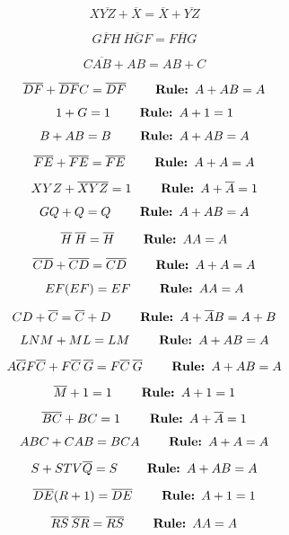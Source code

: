 $$X \overline{YZ} + \overline{X} = \overline{X} + \overline{YZ}$$

$$\overline{GFH} \> \overline{HGF} = \overline{FHG}$$

$$C\overline{AB} + AB = AB + C$$







$$\overline{DF} + \overline{DF} C = \overline{DF} \hskip 20pt \hbox{ \bf Rule: } A + AB = A$$

$$1 + G = 1 \hskip 20pt \hbox{ \bf Rule: } A + 1 = 1$$

$$B + AB = B \hskip 20pt \hbox{ \bf Rule: } A + AB = A$$

$$\overline{FE} + \overline{FE} = \overline{FE} \hskip 20pt \hbox{ \bf Rule: } A + A = A$$

$$XYZ + \overline{XYZ} = 1 \hskip 20pt \hbox{ \bf Rule: } A + \overline{A} = 1$$

$$GQ + Q = Q \hskip 20pt \hbox{ \bf Rule: } A + AB = A$$

$$\overline{H} \> \overline{H} = \overline{H} \hskip 20pt \hbox{ \bf Rule: } AA = A$$

$$\overline{CD} + \overline{CD} = \overline{CD} \hskip 20pt \hbox{ \bf Rule: } A + A = A$$

$$EF(EF) = EF \hskip 20pt \hbox{ \bf Rule: } AA = A$$

$$CD + \overline{C} = \overline{C} + D \hskip 20pt \hbox{ \bf Rule: } A + \overline{A}B = A + B$$

$$LNM + ML = LM \hskip 20pt \hbox{ \bf Rule: } A + AB = A$$

$$A \overline{G} F \overline{C} + F \overline{C} \> \overline{G} = F \overline{C} \> \overline{G} \hskip 20pt \hbox{ \bf Rule: } A + AB = A$$

$$\overline{M} + 1 = 1 \hskip 20pt \hbox{ \bf Rule: } A + 1 = 1$$

$$\overline{BC} + BC = 1 \hskip 20pt \hbox{ \bf Rule: } A + \overline{A} = 1$$

$$ABC + CAB = BCA \hskip 20pt \hbox{ \bf Rule: } A + A = A$$

$$S + STV \overline{Q} = S \hskip 20pt \hbox{ \bf Rule: } A + AB = A$$

$$\overline{DE}(R + 1) = \overline{DE} \hskip 20pt \hbox{ \bf Rule: } A + 1 = 1$$

$$\overline{RS} \> \overline{SR} = \overline{RS} \hskip 20pt \hbox{ \bf Rule: } AA = A$$

